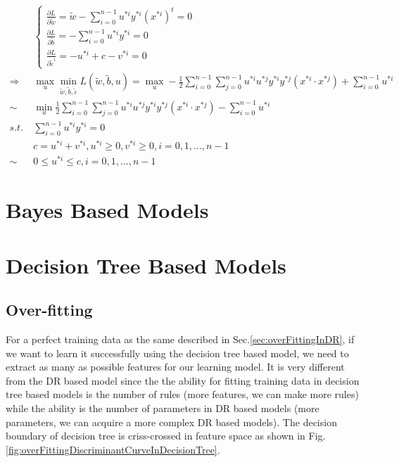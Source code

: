 \documentclass[runningheads,openany]{xhlPaper}
\begin{document}
\begin{equation}
\label{equ:svmSoftSimplificationOOF}
\begin{aligned}
&\left\{ {\begin{array}{*{20}{c}}
{\frac{{\partial L}}{{\partial \tilde w}} = \tilde w - \sum\limits_{i = 0}^{n - 1} {{u^{*i}}{y^{*i}}{{\left( {{x^{*i}}} \right)}^t}}  = 0}\\
{\frac{{\partial L}}{{\partial \tilde b}} =  - \sum\limits_{i = 0}^{n - 1} {{u^{*i}}{y^{*i}}}  = 0}\\
{\frac{{\partial L}}{{\partial {{\tilde \varepsilon }^i}}} =  - {u^{*i}} + c - {v^{*i}} = 0}
\end{array}} \right.\\
 \Rightarrow &\mathop {\max }\limits_u \mathop {\min }\limits_{\tilde w,\tilde b,\tilde \varepsilon } L\left( {\tilde w,\tilde b,u} \right) = \mathop {\max }\limits_u  - \frac{1}{2}\sum\limits_{i = 0}^{n - 1} {\sum\limits_{j = 0}^{n - 1} {{u^{*i}}{u^{*j}}{y^{*i}}{y^{*j}}\left( {{x^{*i}} \cdot {x^{*j}}} \right) + } } \sum\limits_{i = 0}^{n - 1} {{u^{*i}}} \\
 \sim &\mathop {\min }\limits_u \frac{1}{2}\sum\limits_{i = 0}^{n - 1} {\sum\limits_{j = 0}^{n - 1} {{u^{*i}}{u^{*j}}{y^{*i}}{y^{*j}}\left( {{x^{*i}} \cdot {x^{*j}}} \right) - } } \sum\limits_{i = 0}^{n - 1} {{u^{*i}}} \\
s.t.\ &\sum\limits_{i = 0}^{n - 1} {{u^{*i}}{y^{*i}}}  = 0\\
&c = {u^{*i}} + {v^{*i}},{u^{*i}} \ge 0,{v^{*i}} \ge 0,i = 0,1,...,n - 1\\
 \sim\ &0 \le {u^{*i}} \le c,i = 0,1,...,n - 1
\end{aligned}
\end{equation}

\chapter{Bayes Based Models}
\chapter{Decision Tree Based Models}

\section{Over-fitting}
For a perfect training data as the same described in Sec.\ref{sec:overFittingInDR}, if we want to learn it successfully using the decision tree based model, we need to extract as many as possible features for our learning model. 
It is very different from the DR based model since the the ability for fitting training data in decision tree based models is the number of rules (more features, we can make more rules) while the ability is the number of parameters in DR based models (more parameters, we can acquire a more complex DR based models). 
The decision boundary of decision tree is criss-crossed in feature space as shown in Fig.\ref{fig:overFittingDiscriminantCurveInDecisionTree}. 
\end{document}
